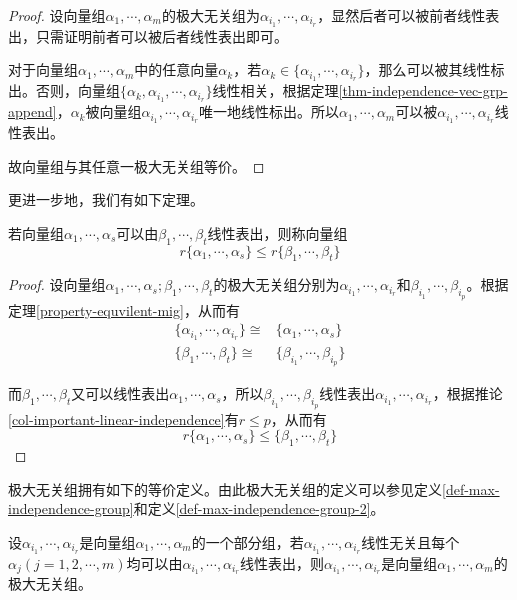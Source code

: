 \begin{proof}
    设向量组$\alpha_1,\cdots,\alpha_m$的极大无关组为$\alpha_{i_1},\cdots,\alpha_{i_r}$，显然后者可以被前者线性表出，只需证明前者可以被后者线性表出即可。

    对于向量组$\alpha_1,\cdots,\alpha_m$中的任意向量$\alpha_k$，若$\alpha_k\in\{\alpha_{i_1},\cdots,\alpha_{i_r}\}$，那么可以被其线性标出。否则，向量组$\{\alpha_k,\alpha_{i_1},\cdots,\alpha_{i_r}\}$线性相关，根据定理\ref{thm-independence-vec-grp-append}，$\alpha_k$被向量组$\alpha_{i_1},\cdots,\alpha_{i_r}$唯一地线性标出。所以$\alpha_1,\cdots,\alpha_m$可以被$\alpha_{i_1},\cdots,\alpha_{i_r}$线性表出。

    故向量组与其任意一极大无关组等价。
\end{proof}

更进一步地，我们有如下定理。

\begin{thm}
    \label{thm-rank-decrease-by-linear-composition}
    若向量组$\alpha_1,\cdots,\alpha_s$可以由$\beta_1,\cdots,\beta_t$线性表出，则称向量组
    \[
        r\{\alpha_1,\cdots,\alpha_s\}\leqslant r\{\beta_1,\cdots,\beta_t\}
    \]
\end{thm}

\begin{proof}
    设向量组$\alpha_1,\cdots,\alpha_s;\beta_1,\cdots,\beta_t$的极大无关组分别为$\alpha_{i_1},\cdots,\alpha_{i_r}$和$\beta_{i_1},\cdots,\beta_{i_p}$。根据定理\ref{property-equvilent-mig}，从而有
    \[
        \begin{aligned}
            \{\alpha_{i_1},\cdots,\alpha_{i_r}\}\cong&\{\alpha_1,\cdots,\alpha_s\} \\
            \{\beta_1,\cdots,\beta_t\}\cong&\{\beta_{i_1},\cdots,\beta_{i_p}\}
        \end{aligned}
    \]

    而$\beta_1,\cdots,\beta_t$又可以线性表出$\alpha_1,\cdots,\alpha_s$，所以$\beta_{i_1},\cdots,\beta_{i_p}$线性表出$\alpha_{i_1},\cdots,\alpha_{i_r}$，根据推论\ref{col-important-linear-independence}有$r\leqslant p$，从而有
    \[
        r\{\alpha_1,\cdots,\alpha_s\}\leqslant\{\beta_1,\cdots,\beta_t\}
    \]
\end{proof}

极大无关组拥有如下的等价定义。由此极大无关组的定义可以参见定义\ref{def-max-independence-group}和定义\ref{def-max-independence-group-2}。

\begin{definition}
    \label{def-max-independence-group-2}
    设$\alpha_{i_1},\cdots,\alpha_{i_r}$是向量组$\alpha_1,\cdots,\alpha_m$的一个部分组，若$\alpha_{i_1},\cdots,\alpha_{i_r}$线性无关且每个$\alpha_j(j=1,2,\cdots,m)$均可以由$\alpha_{i_1},\cdots,\alpha_{i_r}$线性表出，则$\alpha_{i_1},\cdots,\alpha_{i_r}$是向量组$\alpha_1,\cdots,\alpha_m$的极大无关组。
\end{definition}


